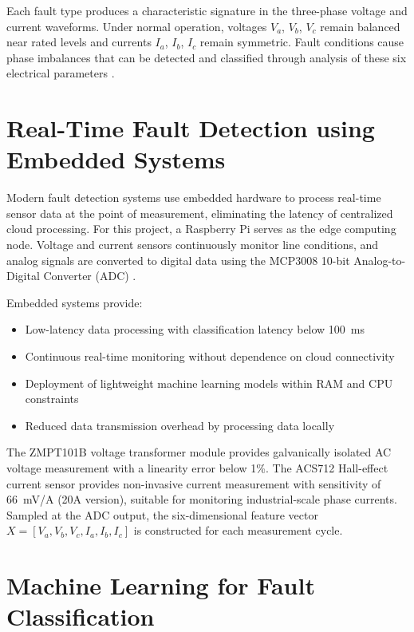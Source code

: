 Each fault type produces a characteristic signature in the three-phase voltage and current waveforms. Under normal operation, voltages $V_a$, $V_b$, $V_c$ remain balanced near rated levels and currents $I_a$, $I_b$, $I_c$ remain symmetric. Fault conditions cause phase imbalances that can be detected and classified through analysis of these six electrical parameters \cite{Anwar2025}.

\section{Real-Time Fault Detection using Embedded Systems}

Modern fault detection systems use embedded hardware to process real-time sensor data at the point of measurement, eliminating the latency of centralized cloud processing. For this project, a Raspberry Pi serves as the edge computing node. Voltage and current sensors continuously monitor line conditions, and analog signals are converted to digital data using the MCP3008 10-bit Analog-to-Digital Converter (ADC) \cite{EdgeML2024}.

Embedded systems provide:
\begin{itemize}
\setlength{\itemsep}{0pt}
\setlength{\parskip}{0pt}
\setlength{\parsep}{0pt}
\item Low-latency data processing with classification latency below 100~ms
\item Continuous real-time monitoring without dependence on cloud connectivity
\item Deployment of lightweight machine learning models within RAM and CPU constraints
\item Reduced data transmission overhead by processing data locally
\end{itemize}

The ZMPT101B voltage transformer module provides galvanically isolated AC voltage measurement with a linearity error below 1\%. The ACS712 Hall-effect current sensor provides non-invasive current measurement with sensitivity of 66~mV/A (20A version), suitable for monitoring industrial-scale phase currents. Sampled at the ADC output, the six-dimensional feature vector $X = [V_a, V_b, V_c, I_a, I_b, I_c]$ is constructed for each measurement cycle.

\section{Machine Learning for Fault Classification}

